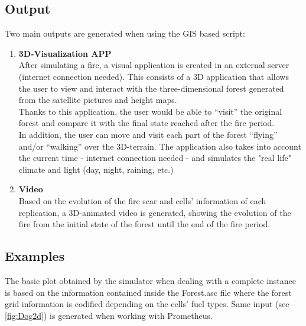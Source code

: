 \documentclass[11pt]{article}
\begin{document}
\subsection{Output}
Two main outputs are generated when using the GIS based script:

\begin{enumerate}
	\item \textbf{3D-Visualization APP}\\
	After simulating a fire, a visual application is created in an external server (internet connection needed). This consists of a 3D application that allows the user to view and interact with the three-dimensional forest generated from the satellite pictures and height maps. \\

	Thanks to this application, the user would be able to ``visit'' the original forest and compare it with the final state reached after the fire period. \\

	In addition, the user can move and visit each part of the forest ``flying'' and/or ``walking'' over the 3D-terrain. The application also takes into account the current time - internet connection needed - and simulates the "real life" climate and light (day, night, raining, etc.)
			
	\item \textbf{Video}\\
	Based on the evolution of the fire scar and cells' information of each replication, a 3D-animated video is generated, showing the evolution of the fire from the initial  state of the forest until the end of the fire period.
	
\end{enumerate}



\subsection{Examples}
The basic plot obtained by the simulator when dealing with a complete instance is based on the information contained inside the Forest.asc file where the forest grid information is codified depending on the cells' fuel types. Same input (see \ref{fig:Dog2d}) is generated when working with Prometheus. 
\end{document}

